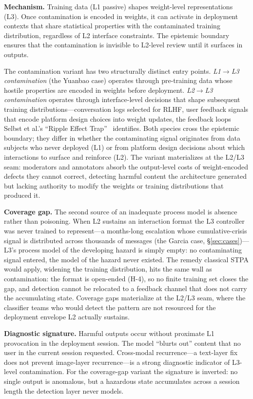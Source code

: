 \documentclass[11pt]{article}
\begin{document}
\textbf{Mechanism.} Training data (L1 passive) shapes weight-level representations (L3). Once contamination is encoded in weights, it can activate in deployment contexts that share statistical properties with the contaminated training distribution, regardless of L2 interface constraints. The epistemic boundary ensures that the contamination is invisible to L2-level review until it surfaces in outputs.

The contamination variant has two structurally distinct entry points. \textit{L1$\to$L3 contamination} (the Yuanbao case) operates through pre-training data whose hostile properties are encoded in weights before deployment. \textit{L2$\to$L3 contamination} operates through interface-level decisions that shape subsequent training distributions---conversation logs selected for RLHF, user feedback signals that encode platform design choices into weight updates, the feedback loops Selbst et al.'s ``Ripple Effect Trap''~\cite{selbst2019fairness} identifies. Both species cross the epistemic boundary; they differ in whether the contaminating signal originates from data subjects who never deployed (L1) or from platform design decisions about which interactions to surface and reinforce (L2). The variant materializes at the L2/L3 seam: moderators and annotators absorb the output-level costs of weight-encoded defects they cannot correct, detecting harmful content the architecture generated but lacking authority to modify the weights or training distributions that produced it.

\textbf{Coverage gap.} The second source of an inadequate process model is absence rather than poisoning. When L2 sustains an interaction format the L3 controller was never trained to represent---a months-long escalation whose cumulative-crisis signal is distributed across thousands of messages (the Garcia case, \S\ref{sec:cases})---L3's process model of the developing hazard is simply empty: no contaminating signal entered, the model of the hazard never existed. The remedy classical STPA would apply, widening the training distribution, hits the same wall as contamination: the format is open-ended (H-4), so no finite training set closes the gap, and detection cannot be relocated to a feedback channel that does not carry the accumulating state. Coverage gaps materialize at the L2/L3 seam, where the classifier teams who would detect the pattern are not resourced for the deployment envelope L2 actually sustains.

\textbf{Diagnostic signature.} Harmful outputs occur without proximate L1 provocation in the deployment session. The model ``blurts out'' content that no user in the current session requested. Cross-modal recurrence---a text-layer fix does not prevent image-layer recurrence---is a strong diagnostic indicator of L3-level contamination. For the coverage-gap variant the signature is inverted: no single output is anomalous, but a hazardous state accumulates across a session length the detection layer never models.
\end{document}
